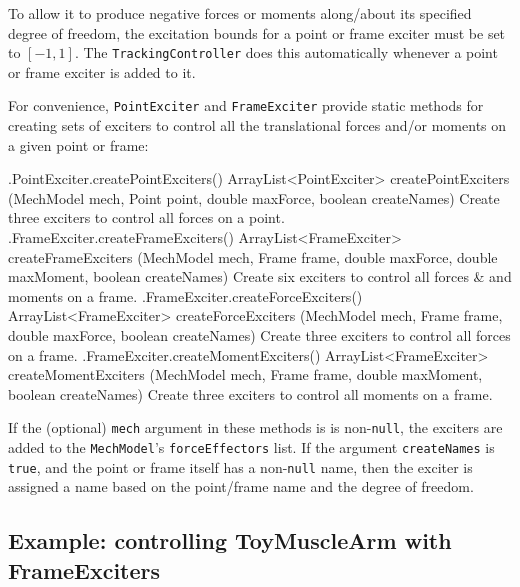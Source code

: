 To allow it to produce negative forces or moments along/about its specified
degree of freedom, the excitation bounds for a point or frame exciter
must be set to $[-1,1]$. The {\tt TrackingController} does this
automatically whenever a point or frame exciter is added to it.

For convenience, {\tt PointExciter} and {\tt FrameExciter} provide static
methods for creating sets of exciters to control all the translational
forces and/or moments on a given point or frame:
%
\begin{methodtable}{0.6}{0.4}
\midline
%
\methodentry
{\inverse .PointExciter.createPointExciters()}%
{ArrayList<PointExciter> createPointExciters (MechModel mech,\brh
Point point, double maxForce, boolean createNames)}%
{Create three exciters to control all forces on a point.}%
%
\methodspace{0.5em}%
\methodentry
{\inverse .FrameExciter.createFrameExciters()}%
{ArrayList<FrameExciter> createFrameExciters (\brh MechModel mech,
Frame frame, double maxForce, \brh double maxMoment, boolean createNames)}%
{Create six exciters to control all forces \& and moments on a frame.}%
%
\methodspace{0.5em}%
\methodentry
{\inverse .FrameExciter.createForceExciters()}%
{ArrayList<FrameExciter> createForceExciters (MechModel mech,\brh
Frame frame, double maxForce, boolean createNames)}%
{Create three exciters to control all forces on a frame.}%
%
\methodspace{0.5em}%
\methodentry
{\inverse .FrameExciter.createMomentExciters()}%
{ArrayList<FrameExciter> createMomentExciters (\brh MechModel mech,
Frame frame, \brh double maxMoment, boolean createNames)}%
{Create three exciters to control all moments on a frame.}%
%
\midline
\end{methodtable}
%
If the (optional) {\tt mech} argument in these methods is
is non-{\tt null}, the exciters are added to
the {\tt MechModel}'s {\tt forceEffectors} list.
If the argument {\tt createNames} is {\tt true},
and the point or frame itself has a non-{\tt null} name,
then the exciter is assigned a name based on the point/frame name
and the degree of freedom.

\subsection{Example: controlling ToyMuscleArm with FrameExciters}

